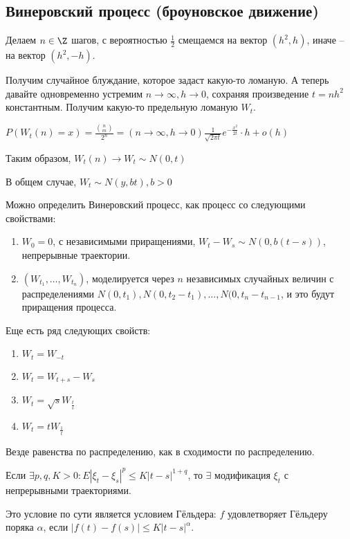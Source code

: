 \subsection{Винеровский процесс (броуновское движение)}
Делаем $n \in \Z$ шагов, с вероятностью $\frac12$ смещаемся на вектор $(h^2, h)$, иначе -- на вектор $(h^2, -h)$.

Получим случайное блуждание, которое задаст какую-то ломаную. А теперь давайте одновременно устремим $n \to \infty, h \to 0$, сохраняя произведение $t = nh^2$ константным.
Получим какую-то предельную ломаную $W_t$.

$P(W_t(n) = x) = \frac{{n \choose m}}{2^n} = (n \to \infty, h \to 0) \frac{1}{\sqrt{2\pi t}} e^{-\frac{x^2}{2t}} \cdot h + o(h)$

Таким образом, $W_t(n) \to W_t \sim N(0, t)$

В общем случае, $W_t \sim N(y, bt), b > 0$

Можно определить Винеровский процесс, как процесс со следующими свойствами:
\begin{enumerate}
\item $W_0 = 0$, с независимыми приращениями, $W_t - W_s \sim N(0, b(t - s))$, непрерывные траектории.

\item $(W_{t_1}, \dots, W_{t_n})$, моделируется через $n$ независимых случайных величин с распределениями $N(0, t_1), N(0, t_2 - t_1), \dots, N(0, t_n - t_{n-1}$, и это будут приращения процесса. 

\end{enumerate}

Еще есть ряд следующих свойств:
\begin{enumerate}
    \item $W_t = W_{-t}$
    \item $W_t = W_{t + s} - W_s$
    \item $W_t = \sqrt{s}W_\frac{t}{s}$
    \item $W_t = t W_{\frac1t}$
\end{enumerate}
Везде равенства по распределению, как в сходимости по распределению.

\begin{theorem}[Колмогоров]

Если $\exists p, q, K > 0 \colon E|\xi_t - \xi_s| ^p \leq K |t - s|^{1 + q}$, то $\exists$ модификация $\xi_t$ с непрерывными траекториями.

\end{theorem}
\begin{Rem}
Это условие по сути является условием Гёльдера: $f$ удовлетворяет Гёльдеру поряка $\alpha$, если $|f(t) - f(s)| \leq K |t - s|^\alpha$.
\end{Rem}

